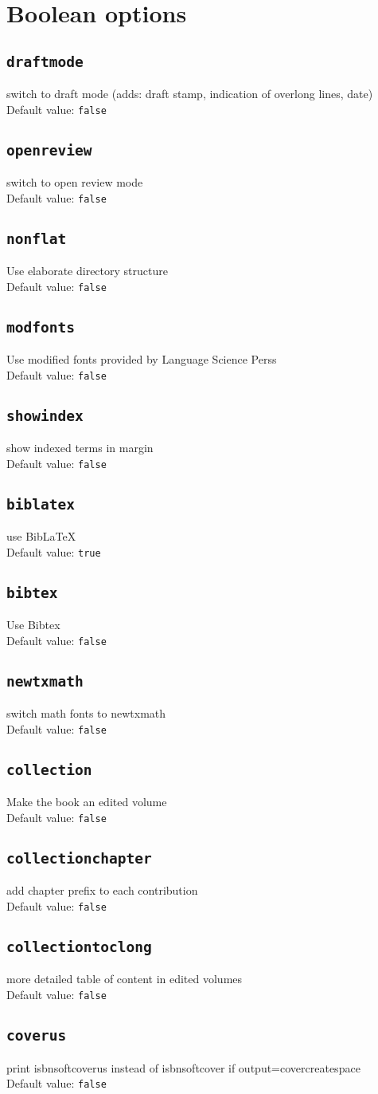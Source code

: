 \documentclass[modfonts,output=guidelines]{langscibook}
\newcommand{\option}[3]{\subsection{\texttt{#1}}{#2}\\Default value: {\texttt{#3}}}
\begin{document}
\section{Boolean options}
\option{draftmode}{switch to draft mode (adds: draft stamp, indication of overlong lines, date)}{false} 
\option{openreview}{switch to open review mode}{false}
\option{nonflat}{Use elaborate directory structure}{false}  
\option{modfonts}{Use modified fonts provided by Language Science Perss}{false}  
\option{showindex}{show indexed terms in margin}{false}
\option{biblatex}{use Bib\LaTeX}{true}
\option{bibtex}{Use Bibtex}{false}  
\option{newtxmath}{switch math fonts to newtxmath}{false}
\option{collection}{Make the book an edited volume}{false}  
\option{collectionchapter}{add chapter prefix to each contribution}{false}
\option{collectiontoclong}{more detailed table of content in edited volumes}{false}
\option{coverus}{print isbnsoftcoverus instead of isbnsoftcover if output=covercreatespace}{false}

\end{document}

